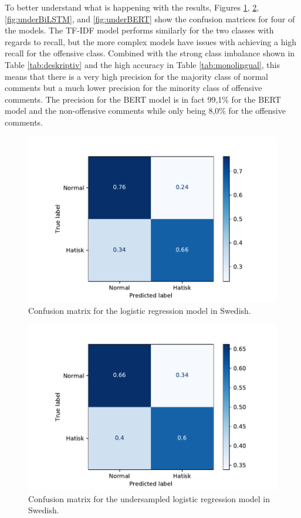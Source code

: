 \documentclass[nofilelist]{cslthse-msc}
\begin{document}
To better understand what is happening with the results,  Figures \ref{fig:tfidf},  \ref{fig:undertfidf}, \ref{fig:underBiLSTM}, and \ref{fig:underBERT}  show the confusion matrices for four of the models. The TF-IDF model performs similarly for the two classes with regards to recall, but the more complex models have issues with achieving a high recall for the offensive class. Combined with the strong class imbalance shown in Table \ref{tab:deskriptiv} and the high accuracy in Table \ref{tab:monolingual}, this means that there is a very high precision for the majority class of normal comments but a much lower precision for the minority class of offensive comments. The precision for the BERT model is in fact 99,1\% for the BERT model and the non-offensive comments while only being 8,0\% for the offensive comments.

\begin{figure}[t]
    \centering
    \includegraphics[width=\textwidth*3/4]{tfidf.pdf}
    \caption{Confusion matrix for the logistic regression model in Swedish.}
    \label{fig:tfidf}
\end{figure}

\begin{figure}[t]
    \centering
    \includegraphics[width=\textwidth*3/4]{undersampledtfidf.pdf}
    \caption{Confusion matrix for the undersampled logistic regression model in Swedish.}
    \label{fig:undertfidf}
\end{figure}
\end{document}
